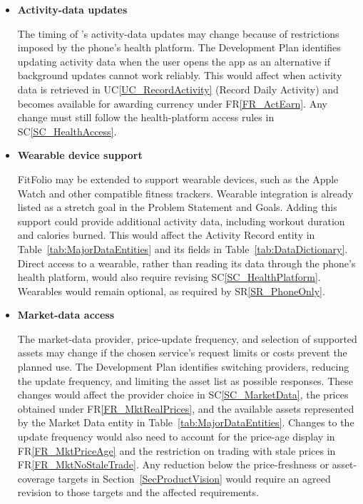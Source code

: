 \documentclass[12pt]{article}
\newcommand{\srref}[1]{SR\ref{#1}}
\newcommand{\ucref}[1]{UC\ref{#1}}
\newcommand{\rref}[1]{FR\ref{#1}}
\newcounter{lcnum} %
\begin{document}
\noindent \begin{itemize}
\item[LC\refstepcounter{lcnum}\thelcnum\label{LC_futureChange}:]
\textbf{Activity-data updates}

The timing of \progname{}'s activity-data updates may change because of restrictions imposed by the phone's health platform. The Development Plan identifies updating activity data when the user opens the app as an alternative if background updates cannot work reliably. This would affect when activity data is retrieved in \ucref{UC_RecordActivity} (Record Daily Activity) and becomes available for awarding currency under \rref{FR_ActEarn}. Any change must still follow the health-platform access rules in SC\ref{SC_HealthAccess}.


\item[LC\refstepcounter{lcnum}\thelcnum\label{LC_secondChange}:]
\textbf{Wearable device support}

FitFolio may be extended to support wearable devices, such as the Apple Watch and other compatible fitness trackers. Wearable integration is already listed as a stretch goal in the Problem Statement and Goals. Adding this support could provide additional activity data, including workout duration and calories burned. This would affect the Activity Record entity in Table~\ref{tab:MajorDataEntities} and its fields in Table~\ref{tab:DataDictionary}. Direct access to a wearable, rather than reading its data through the phone's health platform, would also require revising SC\ref{SC_HealthPlatform}. Wearables would remain optional, as required by \srref{SR_PhoneOnly}.

\item[LC\refstepcounter{lcnum}\thelcnum\label{LC_thirdChange}:]
\textbf{Market-data access}

The market-data provider, price-update frequency, and selection of supported assets may change if the chosen service's request limits or costs prevent the planned use. The Development Plan identifies switching providers, reducing the update frequency, and limiting the asset list as possible responses. These changes would affect the provider choice in SC\ref{SC_MarketData}, the prices obtained under \rref{FR_MktRealPrices}, and the available assets represented by the Market Data entity in Table~\ref{tab:MajorDataEntities}. Changes to the update frequency would also need to account for the price-age display in \rref{FR_MktPriceAge} and the restriction on trading with stale prices in \rref{FR_MktNoStaleTrade}. Any reduction below the price-freshness or asset-coverage targets in Section~\ref{SecProductVision} would require an agreed revision to those targets and the affected requirements.


\end{itemize}
\end{document}
